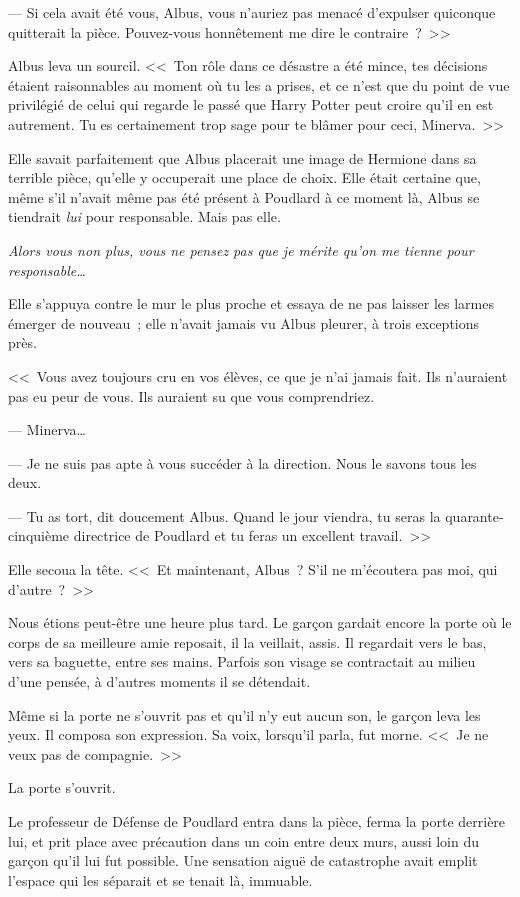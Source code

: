 --- Si cela avait été vous, Albus, vous n'auriez pas menacé d'expulser quiconque quitterait la pièce. Pouvez-vous honnêtement me dire le contraire~?~>>

Albus leva un sourcil. <<~Ton rôle dans ce désastre a été mince, tes décisions étaient raisonnables au moment où tu les a prises, et ce n'est que du point de vue privilégié de celui qui regarde le passé que Harry Potter peut croire qu'il en est autrement. Tu es certainement trop sage pour te blâmer pour ceci, Minerva.~>>

Elle savait parfaitement que Albus placerait une image de Hermione dans sa terrible pièce, qu'elle y occuperait une place de choix. Elle était certaine que, même s'il n'avait même pas été présent à Poudlard à ce moment là, Albus se tiendrait \emph{lui} pour responsable. Mais pas elle.

\emph{Alors vous non plus, vous ne pensez pas que je mérite qu'on me tienne pour responsable…}

Elle s'appuya contre le mur le plus proche et essaya de ne pas laisser les larmes émerger de nouveau~; elle n'avait jamais vu Albus pleurer, à trois exceptions près.

<<~Vous avez toujours cru en vos élèves, ce que je n'ai jamais fait. Ils n'auraient pas eu peur de vous. Ils auraient su que vous comprendriez.

--- Minerva…

--- Je ne suis pas apte à vous succéder à la direction. Nous le savons tous les deux.

--- Tu as tort, dit doucement Albus. Quand le jour viendra, tu seras la quarante-cinquième directrice de Poudlard et tu feras un excellent travail.~>>

Elle secoua la tête. <<~Et maintenant, Albus~? S'il ne m'écoutera pas moi, qui d'autre~?~>>

\later

Nous étions peut-être une heure plus tard. Le garçon gardait encore la porte où le corps de sa meilleure amie reposait, il la veillait, assis. Il regardait vers le bas, vers sa baguette, entre ses mains. Parfois son visage se contractait au milieu d'une pensée, à d'autres moments il se détendait.

Même si la porte ne s'ouvrit pas et qu'il n'y eut aucun son, le garçon leva les yeux. Il composa son expression. Sa voix, lorsqu'il parla, fut morne. <<~Je ne veux pas de compagnie.~>>

La porte s'ouvrit.

Le professeur de Défense de Poudlard entra dans la pièce, ferma la porte derrière lui, et prit place avec précaution dans un coin entre deux murs, aussi loin du garçon qu'il lui fut possible. Une sensation aiguë de catastrophe avait emplit l'espace qui les séparait et se tenait là, immuable.

